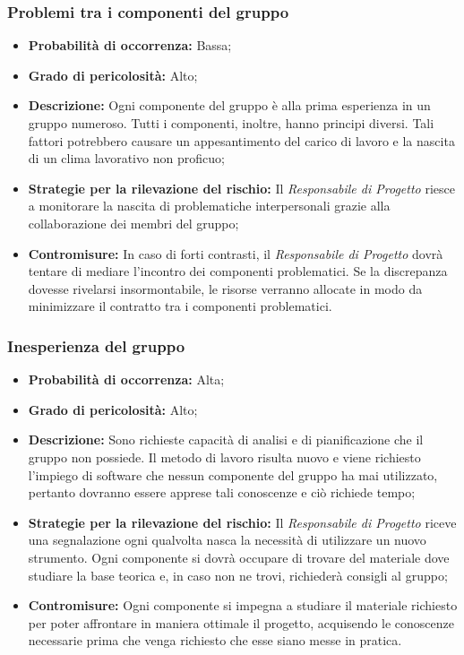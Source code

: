 		\subsubsection{Problemi tra i componenti del gruppo}
		\begin{itemize}
			\item \textbf{Probabilità di occorrenza:} Bassa; \\
			\item \textbf{Grado di pericolosità:} Alto; \\
			\item \textbf{Descrizione:} Ogni componente del gruppo è alla prima esperienza in un gruppo numeroso. Tutti i componenti, inoltre, hanno principi diversi. Tali fattori potrebbero causare un appesantimento del carico di lavoro e la nascita di un clima lavorativo non proficuo; \\
			\item \textbf{Strategie per la rilevazione del rischio:} Il \textit{Responsabile di Progetto} riesce a monitorare la nascita di problematiche interpersonali grazie alla collaborazione dei membri del gruppo; \\
			\item \textbf{Contromisure:} In caso di forti contrasti, il \textit{Responsabile di Progetto} dovrà tentare di mediare l'incontro dei componenti problematici. Se la discrepanza dovesse rivelarsi insormontabile, le risorse verranno allocate in modo da minimizzare il contratto tra i componenti problematici. \\
		\end{itemize}
		\subsubsection{Inesperienza del gruppo}
		\begin{itemize}
			\item \textbf{Probabilità di occorrenza:} Alta; \\
			\item \textbf{Grado di pericolosità:} Alto; \\
			\item \textbf{Descrizione:} Sono richieste capacità di analisi e di pianificazione che il gruppo non possiede. Il metodo di lavoro risulta nuovo e viene richiesto l'impiego di software che nessun componente del gruppo ha mai utilizzato, pertanto dovranno essere apprese tali conoscenze e ciò richiede tempo; \\
			\item \textbf{Strategie per la rilevazione del rischio:} Il \textit{Responsabile di Progetto} riceve una segnalazione ogni qualvolta nasca la necessità di utilizzare un nuovo strumento. Ogni componente si dovrà occupare di trovare del materiale dove studiare la base teorica e, in caso non ne trovi, richiederà consigli al gruppo; \\
			\item \textbf{Contromisure:} Ogni componente si impegna a studiare il materiale richiesto per poter affrontare in maniera ottimale il progetto, acquisendo le conoscenze necessarie prima che venga richiesto che esse siano messe in pratica.  \\
		\end{itemize}
